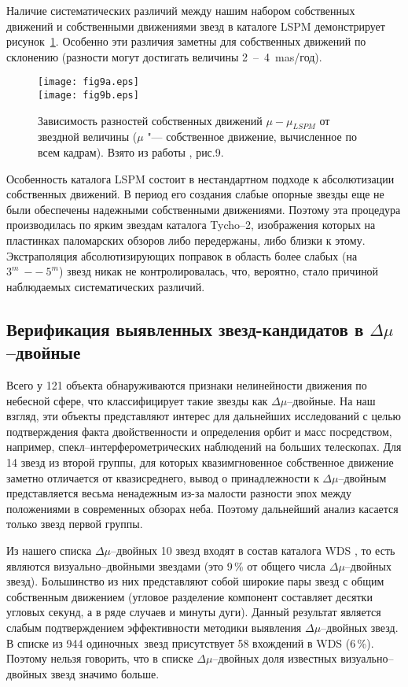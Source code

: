 Наличие систематических различий между нашим набором собственных движений и собственными движениями звезд в каталоге LSPM демонстрирует рисунок~\ref{fig:15dmu}. Особенно эти различия заметны для собственных движений по склонению (разности могут достигать величины 2~--~4~mas/год).
\begin{figure}[h]
\centering
\texttt{[image: fig9a.eps]}\\
\texttt{[image: fig9b.eps]}
\caption{Зависимость разностей собственных движений $\mu - \mu_{LSPM}$ от звездной величины ($\mu$ "--- собственное движение, вычисленное по всем кадрам). Взято из работы \cite{2015AstL...41..833K}, рис.9.}
\label{fig:15dmu}
\end{figure}
Особенность каталога LSPM состоит в нестандартном подходе к абсолютизации собственных движений. В период его создания слабые опорные звезды еще не были обеспечены надежными собственными движениями. Поэтому эта процедура производилась по ярким звездам каталога Tycho--2, изображения которых на пластинках паломарских обзоров либо передержаны, либо близки к этому. Экстраполяция абсолютизирующих поправок в область более слабых (на $3^m~--~5^m$) звезд никак не контролировалась, что, вероятно, стало причиной наблюдаемых систематических различий.
\subsection{Верификация выявленных звезд-кандидатов в $\Delta\mu$--двойные} \label{subsec:ch3/sect3/sub3}
Всего у 121 объекта обнаруживаются признаки нелинейности движения по небесной сфере, что классифицирует такие звезды как $\Delta\mu$--двойные. На наш взгляд, эти объекты представляют интерес для дальнейших исследований с целью подтверждения факта двойственности и определения орбит и масс посредством, например,  спекл--интерферометрических наблюдений на больших телескопах. Для 14 звезд из второй группы, для которых квазимгновенное собственное движение заметно отличается от квазисреднего, вывод о принадлежности к $\Delta\mu$--двойным представляется весьма ненадежным из-за малости разности эпох между положениями в современных обзорах неба. Поэтому дальнейший анализ касается только звезд первой группы.

Из нашего списка $\Delta\mu$--двойных 10 звезд входят в состав каталога WDS \cite{2001AJ....122.3466M}, то есть являются визуально--двойными звездами (это 9\,\% от общего числа $\Delta\mu$--двойных звезд). Большинство из них представляют собой широкие пары звезд с общим собственным движением (угловое разделение компонент составляет десятки угловых секунд, а в ряде случаев и минуты дуги). Данный результат является слабым подтверждением эффективности методики выявления $\Delta\mu$--двойных звезд. В списке из 944 \glqq одиночных\grqq\ звезд присутствует 58 вхождений в WDS (6\,\%). Поэтому нельзя говорить, что в списке  $\Delta\mu$--двойных доля известных визуально--двойных звезд значимо больше.

